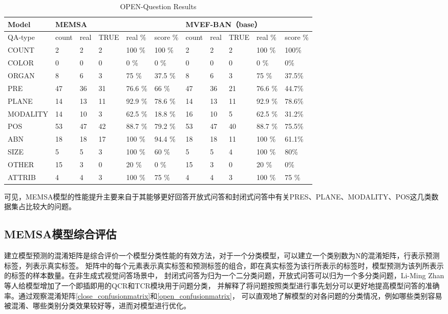 \begin{table}
	\caption{\label{tab:qt-open-end}OPEN-Question Results}
	\centering
	\small %
	\begin{tabular}{l|lllll|lllll}
		\hline Model & \multicolumn{5}{|l}{\textbf{MEMSA}} & \multicolumn{5}{|l}{\textbf{MVEF-BAN}（base）} \\ 
		\hline QA-type & count & real & TRUE & real \% & score \% & count & real & TRUE & real \% & score \%\\
		\hline COUNT & 2 & 2 & 2 & 100 \%& 100 \%& 2 & 2 & 2 & 100 \%& 100\%\\
		COLOR & 0 & 0 & 0 & 0 \%& 0 \%& 0 & 0 & 0 & 0 \%& 0\%\ \\
		ORGAN & 8 & 6 & 3 & 75 \%& 37.5 \% & 8 & 6 & 3 & 75 \%& 37.5\%\\
		PRE & 47 & 36 & 31 & 76.6 \%& 66 \% & 47 & 36 & 21 & 76.6 \%& 44.7\%\\
		PLANE & 14 & 13 & 11 & 92.9 \%& 78.6 \% & 14 & 13 & 11 & 92.9 \%& 78.6\%\\
		MODALITY & 14 & 10 & 3 & 62.5 \%& 18.8 \% & 16 & 10 & 5 & 62.5 \%& 31.2\%\\
		POS & 53 & 47 & 42 & 88.7 \%& 79.2 \%& 53 & 47 & 40 & 88.7 \%& 75.5\%\\
		ABN & 18 & 18 & 17 & 100 \%& 94.4 \%& 18 & 18 & 11 & 100 \%& 61.1\%\\
		SIZE & 5 & 5 & 3 & 100 \%& 60 \%& 5 & 5 & 4 & 100 \%& 80\%\\
		OTHER & 15 & 3 & 0 & 20 \%& 0 \%& 15 & 3 & 0 & 20 \%& 0\%\\
		ATTRIB &4 &4 &3 & 100 \%& 75 \%& 4 & 4 & 3 & 100 \%& 75 \% \\
		\hline
		\end{tabular}
\end{table}
可见，MEMSA模型的性能提升主要来自于其能够更好回答开放式问答和封闭式问答中有关PRES、PLANE、MODALITY、POS这几类数据集占比较大的问题。
\subsection{MEMSA模型综合评估}
建立模型预测的混淆矩阵是综合评价一个模型分类性能的有效方法，对于一个分类模型，可以建立一个类别数为N的混淆矩阵，行表示预测标签，列表示真实标签。
矩阵中的每个元素表示真实标签和预测标签的组合，即在真实标签为该行所表示的标签时，模型预测为该列所表示的标签的样本数量。在非生成式视觉问答场景中，
封闭式问答为归为一个二分类问题，开放式问答可以归为一个多分类问题，Li-Ming Zhan等人给模型增加了一个即插即用的QCR和TCR模块\cite{zhan2020medical}用于问题分类，
并解释了将问题按照类型进行事先划分可以更好地提高模型问答的准确率。通过观察混淆矩阵\ref{close_confusionmatrix}和\ref{open_confusionmatrix}，
可以直观地了解模型的对各问题的分类情况，例如哪些类别容易被混淆、哪些类别分类效果较好等，进而对模型进行优化。

